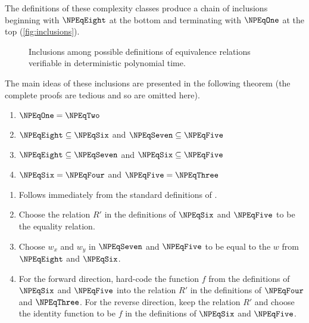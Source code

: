 The definitions of these complexity classes produce a chain of inclusions beginning with $\NPEqEight$ at the bottom and terminating with $\NPEqOne$ at the top (\autoref{fig:inclusions}).
\begin{figure}
  \caption{\label{fig:inclusions}Inclusions among possible definitions of equivalence relations verifiable in deterministic polynomial time.}
  \begin{center}
  \end{center}
\end{figure}
The main ideas of these inclusions are presented in the following theorem (the complete proofs are tedious and so are omitted here).
\begin{theorem}\label{thm:definitions}\mbox{}
  \begin{enumerate}
  \item $\NPEqOne = \NPEqTwo$
  \item $\NPEqEight \subseteq \NPEqSix$ and $\NPEqSeven \subseteq \NPEqFive$
  \item $\NPEqEight \subseteq \NPEqSeven$ and $\NPEqSix \subseteq \NPEqFive$
  \item $\NPEqSix = \NPEqFour$ and $\NPEqFive = \NPEqThree$
  \end{enumerate}
\end{theorem}
\begin{sketch}\mbox{}
  \begin{enumerate}
  \item Follows immediately from the standard definitions of \NP.
  \item Choose the relation $R'$ in the definitions of $\NPEqSix$ and $\NPEqFive$ to be the equality relation.
  \item Choose $w_x$ and $w_y$ in $\NPEqSeven$ and $\NPEqFive$ to be equal to the $w$ from $\NPEqEight$ and $\NPEqSix$.
  \item
    For the forward direction, hard-code the function $f$ from the definitions of $\NPEqSix$ and $\NPEqFive$ into the relation $R'$ in the definitions of $\NPEqFour$ and $\NPEqThree$.
    For the reverse direction, keep the relation $R'$ and choose the identity function to be $f$ in the definitions of $\NPEqSix$ and $\NPEqFive$.
    \qedhere
  \end{enumerate}
\end{sketch}


